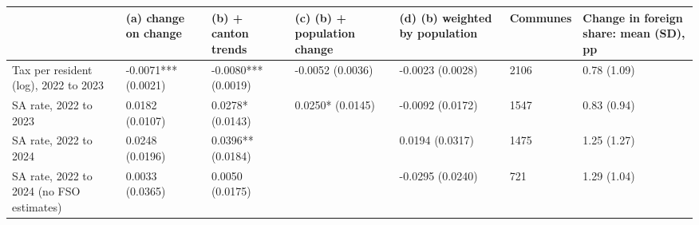\begin{tabular}{lllllll}
\toprule
 & (a) change on change & (b) + canton trends & (c) (b) + population change & (d) (b) weighted by population & Communes & Change in foreign share: mean (SD), pp \\
\midrule
Tax per resident (log), 2022 to 2023 & -0.0071*** (0.0021) & -0.0080*** (0.0019) & -0.0052 (0.0036) & -0.0023 (0.0028) & 2106 & 0.78 (1.09) \\
SA rate, 2022 to 2023 & 0.0182 (0.0107) & 0.0278* (0.0143) & 0.0250* (0.0145) & -0.0092 (0.0172) & 1547 & 0.83 (0.94) \\
SA rate, 2022 to 2024 & 0.0248 (0.0196) & 0.0396** (0.0184) &  & 0.0194 (0.0317) & 1475 & 1.25 (1.27) \\
SA rate, 2022 to 2024 (no FSO estimates) & 0.0033 (0.0365) & 0.0050 (0.0175) &  & -0.0295 (0.0240) & 721 & 1.29 (1.04) \\
\bottomrule
\end{tabular}
